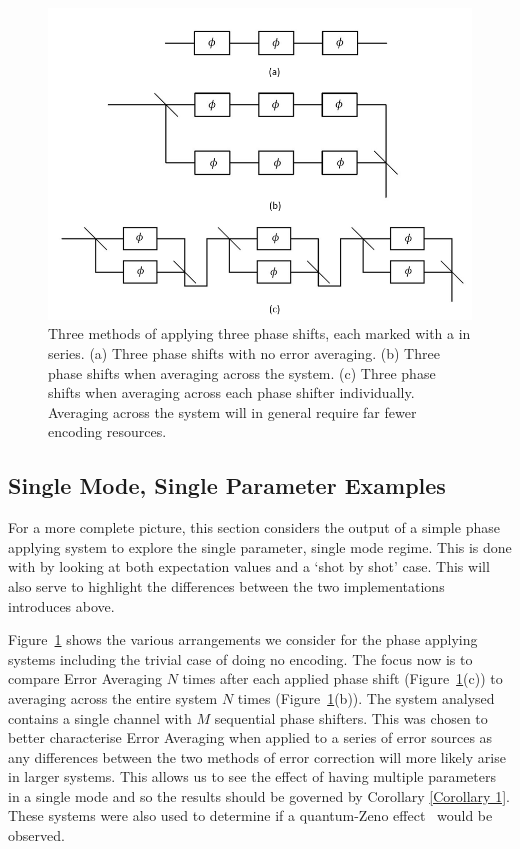 \documentclass[aps,pra,twocolumn,superscriptaddress,numerical,floatfix]{revtex4-1}
\begin{document}
\begin{figure}
\includegraphics[width=\columnwidth]{three_phase_applying_systems.PNG}
\caption{Three methods of applying three phase shifts, each marked with a in
	series. (a) Three phase shifts with no error averaging. (b) Three phase
	shifts when averaging across the system. (c) Three phase shifts when
	averaging across each phase shifter individually. Averaging across the
	system will in general require far fewer encoding resources.
	\label{fig:Different methods of implementation}}
\end{figure}

\subsection{Single Mode, Single Parameter Examples \label{Phase applying systems}}

For a more complete picture, this section considers the output of a simple phase applying system to explore the single parameter, single mode regime. This is done with by looking at both expectation values and a `shot by shot' case. This will also serve to highlight the differences between the two implementations introduces above.

Figure~\ref{fig:Different methods of implementation} shows the various arrangements we consider for the phase applying systems including the trivial case of doing no encoding.  
The focus now is to compare Error Averaging $N$ times after each applied phase shift (Figure~\ref{fig:Different methods of implementation}(c)) to averaging across the entire system $N$ times (Figure~\ref{fig:Different methods of implementation}(b)). The system analysed contains a single channel with $M$ sequential phase shifters. This was chosen to better characterise Error Averaging when applied to a series of error sources as any differences between the two methods of error correction will more likely arise in larger systems. This allows us to see the effect of having multiple parameters in a single mode and so the results should be governed by Corollary \ref{Corollary 1}. These systems were also used to determine if a quantum-Zeno effect~\cite{expZeno} would be observed.
\end{document}
